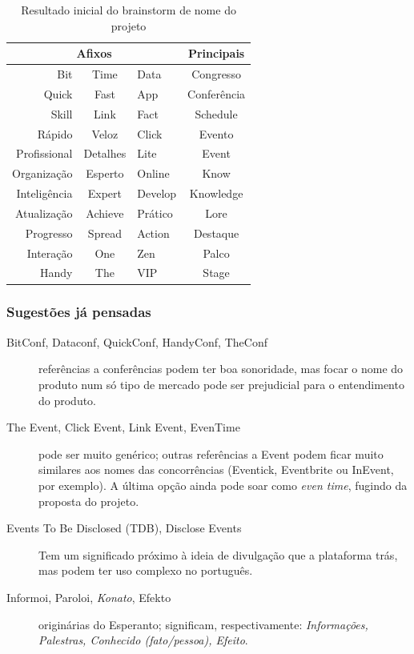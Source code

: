 \documentclass[12pt,a4paper,twoside,hyphens,english,brazil]{abntex2}
\begin{document}
\begin{table}[h]
	\caption{Resultado inicial do brainstorm de nome do projeto}
	\centering
	\begin{tabular}{rcl|c}
		\multicolumn{3}{c|}{\textbf{Afixos}}& \textbf{Principais} \\\hline
		Bit			& Time		& Data		& Congresso		 \\\cline{1-3}
		Quick		& Fast		& App		& Conferência	 \\\cline{1-3}
		Skill		& Link		& Fact		& Schedule		 \\\cline{1-3}
		Rápido		& Veloz		& Click 	& Evento		 \\\cline{1-3}
		Profissional& Detalhes	& Lite		& Event			 \\\cline{1-3}
		Organização	& Esperto	& Online	& Know			 \\\cline{1-3}
		Inteligência& Expert	& Develop	& Knowledge		 \\\cline{1-3}
		Atualização	& Achieve	& Prático	& Lore			 \\\cline{1-3}
		Progresso	& Spread	& Action	& Destaque		 \\\cline{1-3}
		Interação	& One		& Zen		& Palco			 \\\cline{1-3}
		Handy		& The		& VIP		& Stage			
	\end{tabular}
	\label{tab:nomes}
\end{table}

\subsubsection*{Sugestões já pensadas}
\begin{description}
	\item[BitConf, Dataconf, QuickConf, HandyConf, TheConf] referências a conferências podem ter boa sonoridade, mas focar o nome do produto num só tipo de mercado pode ser prejudicial para o entendimento do produto.
	\item[The Event, Click Event, Link Event, EvenTime] pode ser muito genérico; outras referências a Event podem ficar muito similares aos nomes das concorrências (Eventick, Eventbrite ou InEvent, por exemplo). A última opção ainda pode soar como \emph{even time}, fugindo da proposta do projeto.
	\item[Events To Be Disclosed (TDB), Disclose Events] Tem um significado próximo à ideia de divulgação que a plataforma trás, mas podem ter uso complexo no português.
	\item[Informoi, Paroloi, \emph{Konato}, Efekto] originárias do Esperanto; significam, respectivamente: \emph{Informações, Palestras, Conhecido (fato/pessoa), Efeito}.
\end{description}
\end{document}
